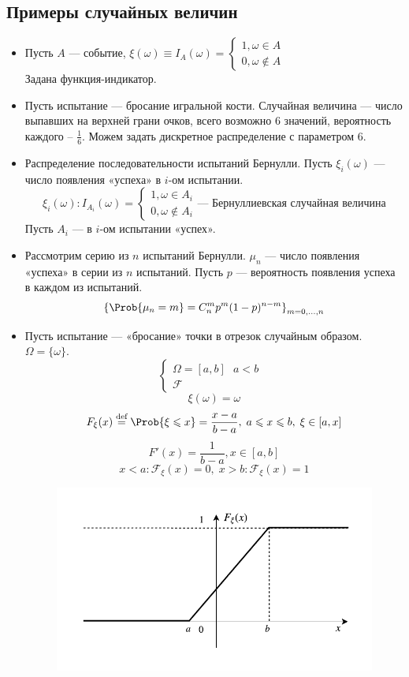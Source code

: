 \subsection{Примеры случайных величин}
\begin{itemize}
	\item Пусть $A$ --- событие, $\xi(\omega) \equiv I_A (\omega) = \begin{cases}
		1, \omega \in A \\
		0, \omega \not \in A
	\end{cases} $ \\
	Задана функция-индикатор.
	\item Пусть испытание --- бросание игральной кости. Случайная величина --- число выпавших на верхней грани очков, всего возможно 6 значений, вероятность каждого -- $\frac{1}{6}$. Можем задать дискретное распределение с параметром 6.
	\item Распределение последовательности испытаний Бернулли. Пусть $\xi_i (\omega)$ --- число появления «успеха» в $i$-ом испытании.
	\[
		\xi_i (\omega) : I_{A_i} (\omega) = \begin{cases}
		1, \omega \in A_i \\
		0, \omega \not \in A_i
	\end{cases} \text{--- Бернуллиевская случайная величина}
	\]
	Пусть $A_i$ --- в $i$-ом испытании «успех».
	\item Рассмотрим серию из $n$ испытаний Бернулли. $\mu_n$ --- число появления «успеха» в серии из $n$ испытаний. Пусть $p$ --- вероятность появления успеха в каждом из испытаний.
	\[
		{\{ \Prob \{ \mu_n = m \} = C_n^m p^m (1-p)^{n-m} \}}_{m = 0, \ldots, n}
	\]
	\item Пусть испытание --- «бросание» точки в отрезок случайным образом. $\Omega = \{ \omega \}$.
	\[
		\begin{cases}
			\Omega = [a, b] \text{ $a < b$ } \\
			\mathcal{F}
		\end{cases}
	\]
	\[
		\xi (\omega) = \omega
	\]
	\[
		F_\xi (x) \overset{\textrm{def}}{=} \Prob \{ \xi \leqslant x \} = \frac{x - a}{b - a}, \; a \leqslant x \leqslant b, \; \xi \in [a, x]
	\]
	\[
		F' (x) = \frac{1}{b-a}, x \in [a, b]
	\]
	\[
		x < a : \mathcal{F}_\xi (x) = 0, \; x > b : \mathcal{F}_\xi (x) = 1
	\]
\begin{figure}[H]
	\begin{center}
	\includegraphics[width=\textwidth,height=\textheight,keepaspectratio]{Images/plot2-5.pdf}

\end{center}
\end{figure}
\end{itemize}
